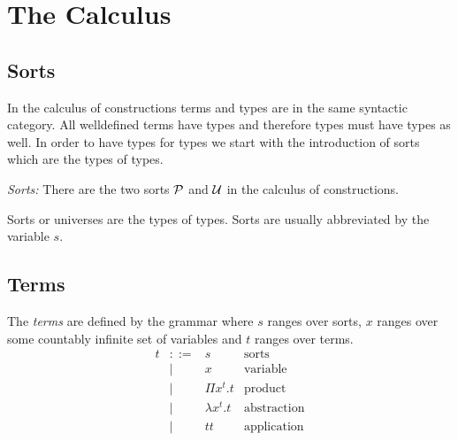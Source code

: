 \section{The Calculus}






\subsection{Sorts}


In the calculus of constructions terms and types are in the same
syntactic category. All welldefined terms have types and therefore types must
have types as well. In order to have types for types we start with the
introduction of sorts which are the types of types.

\begin{definition}
    \emph{Sorts:} There are the two sorts ${\cal P}$ and ${\cal U}$ in the calculus of
    constructions.

    Sorts or universes are the types of types. Sorts are usually abbreviated by
    the variable $s$.
\end{definition}





\subsection{Terms}

\begin{definition}
    The \emph{terms} are defined by the grammar where $s$ ranges over sorts, $x$
    ranges over some countably infinite set of variables and $t$ ranges over
    terms.
    $$
    \begin{array}{llll}
        t

        &::=& s & \text{sorts}

        \\

        &\mid & x & \text{variable}

        \\

        &\mid & \Pi x^t. t & \text{product}

        \\

        &\mid & \lambda x^t. t & \text{abstraction}

        \\

        &\mid & t t & \text{application}
    \end{array}
    $$
\end{definition}







